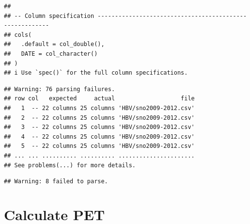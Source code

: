 \documentclass[
]{book}
\newenvironment{Shaded}{\begin{snugshade}}{\end{snugshade}}
\newcommand{\AttributeTok}[1]{\textcolor[rgb]{0.77,0.63,0.00}{#1}}
\newcommand{\CommentTok}[1]{\textcolor[rgb]{0.56,0.35,0.01}{\textit{#1}}}
\newcommand{\FunctionTok}[1]{\textcolor[rgb]{0.00,0.00,0.00}{#1}}
\newcommand{\NormalTok}[1]{#1}
\newcommand{\OtherTok}[1]{\textcolor[rgb]{0.56,0.35,0.01}{#1}}
\newcommand{\SpecialCharTok}[1]{\textcolor[rgb]{0.00,0.00,0.00}{#1}}
\newcommand{\StringTok}[1]{\textcolor[rgb]{0.31,0.60,0.02}{#1}}
\begin{document}
\begin{Shaded}
\end{Shaded}

\begin{verbatim}
## 
## -- Column specification --------------------------------------------------------
## cols(
##   .default = col_double(),
##   DATE = col_character()
## )
## i Use `spec()` for the full column specifications.
\end{verbatim}

\begin{verbatim}
## Warning: 76 parsing failures.
## row col   expected     actual                   file
##   1  -- 22 columns 25 columns 'HBV/sno2009-2012.csv'
##   2  -- 22 columns 25 columns 'HBV/sno2009-2012.csv'
##   3  -- 22 columns 25 columns 'HBV/sno2009-2012.csv'
##   4  -- 22 columns 25 columns 'HBV/sno2009-2012.csv'
##   5  -- 22 columns 25 columns 'HBV/sno2009-2012.csv'
## ... ... .......... .......... ......................
## See problems(...) for more details.
\end{verbatim}

\begin{verbatim}
## Warning: 8 failed to parse.
\end{verbatim}

\hypertarget{calculate-pet-1}{%
\section{Calculate PET}\label{calculate-pet-1}}
\end{document}
